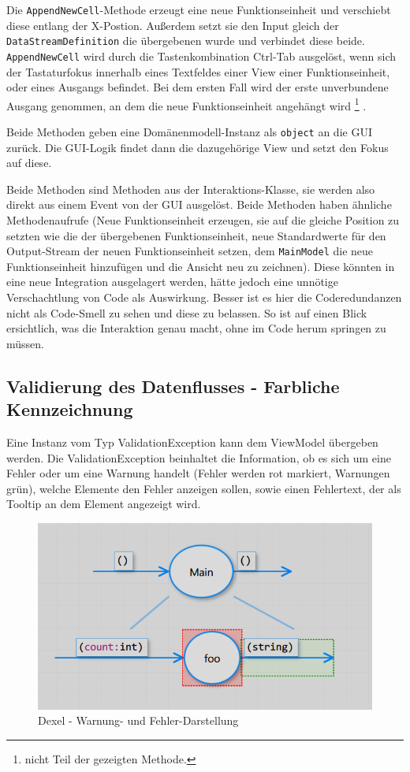 	Die \texttt{AppendNewCell}-Methode erzeugt eine neue Funktionseinheit und 
	verschiebt diese entlang der X-Postion.
	Außerdem setzt sie den Input gleich der \texttt{DataStreamDefinition} die
	übergebenen wurde und verbindet diese beide.
	\texttt{AppendNewCell} wird durch die Tastenkombination Ctrl-Tab ausgelöst, wenn
	sich der Tastaturfokus innerhalb eines Textfeldes einer View einer Funktionseinheit, oder eines Ausgangs befindet. Bei dem ersten Fall wird der erste unverbundene Ausgang genommen, an dem die neue Funktionseinheit angehängt wird \footnote{nicht Teil der gezeigten Methode.} .
	
	Beide Methoden geben eine
	Domänenmodell-Instanz als \texttt{object} an die GUI zurück. Die GUI-Logik findet dann die
	dazugehörige View und setzt den Fokus auf diese.
	
	Beide Methoden sind Methoden aus der Interaktions-Klasse, sie werden also
	direkt aus einem Event von der GUI ausgelöst. 
	Beide Methoden haben ähnliche Methodenaufrufe (Neue Funktionseinheit
	erzeugen, sie auf die gleiche Position zu setzten wie die der übergebenen
	Funktionseinheit, neue Standardwerte für den Output-Stream der neuen
	Funktionseinheit setzen, dem \texttt{MainModel} die neue Funktionseinheit hinzufügen
  und die Ansicht neu zu zeichnen).
  Diese könnten in eine neue Integration ausgelagert werden, hätte jedoch eine unnötige
	Verschachtlung von Code als Auswirkung. Besser ist es hier die
	Coderedundanzen nicht als Code-Smell zu sehen und diese zu belassen.
	So ist auf einen Blick ersichtlich, was die Interaktion genau macht, ohne
	im Code herum springen zu müssen.






\subsection{Validierung des Datenflusses - Farbliche Kennzeichnung }

Eine Instanz vom Typ ValidationException kann dem ViewModel übergeben werden.
Die ValidationException beinhaltet die Information, ob es sich um eine Fehler oder um eine Warnung handelt (Fehler werden rot markiert, Warnungen grün), welche Elemente den Fehler anzeigen sollen, sowie einen Fehlertext, der als Tooltip an dem Element angezeigt wird.

\begin{figure}[H]
	\centering
	\includegraphics[width=0.6\linewidth]{./img/DexelValidation.png}
	\caption{Dexel - Warnung- und Fehler-Darstellung}
\end{figure}



